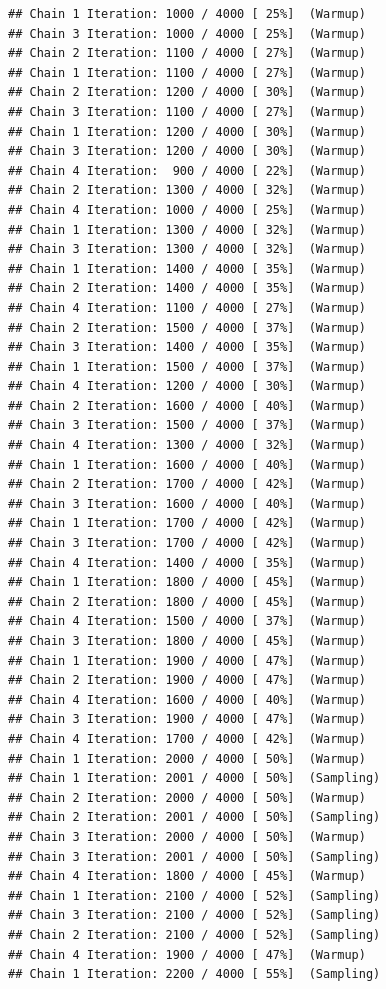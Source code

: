 \documentclass[
]{article}
\begin{document}
\begin{verbatim}
## Chain 1 Iteration: 1000 / 4000 [ 25%]  (Warmup) 
## Chain 3 Iteration: 1000 / 4000 [ 25%]  (Warmup) 
## Chain 2 Iteration: 1100 / 4000 [ 27%]  (Warmup) 
## Chain 1 Iteration: 1100 / 4000 [ 27%]  (Warmup) 
## Chain 2 Iteration: 1200 / 4000 [ 30%]  (Warmup) 
## Chain 3 Iteration: 1100 / 4000 [ 27%]  (Warmup) 
## Chain 1 Iteration: 1200 / 4000 [ 30%]  (Warmup) 
## Chain 3 Iteration: 1200 / 4000 [ 30%]  (Warmup) 
## Chain 4 Iteration:  900 / 4000 [ 22%]  (Warmup) 
## Chain 2 Iteration: 1300 / 4000 [ 32%]  (Warmup) 
## Chain 4 Iteration: 1000 / 4000 [ 25%]  (Warmup) 
## Chain 1 Iteration: 1300 / 4000 [ 32%]  (Warmup) 
## Chain 3 Iteration: 1300 / 4000 [ 32%]  (Warmup) 
## Chain 1 Iteration: 1400 / 4000 [ 35%]  (Warmup) 
## Chain 2 Iteration: 1400 / 4000 [ 35%]  (Warmup) 
## Chain 4 Iteration: 1100 / 4000 [ 27%]  (Warmup) 
## Chain 2 Iteration: 1500 / 4000 [ 37%]  (Warmup) 
## Chain 3 Iteration: 1400 / 4000 [ 35%]  (Warmup) 
## Chain 1 Iteration: 1500 / 4000 [ 37%]  (Warmup) 
## Chain 4 Iteration: 1200 / 4000 [ 30%]  (Warmup) 
## Chain 2 Iteration: 1600 / 4000 [ 40%]  (Warmup) 
## Chain 3 Iteration: 1500 / 4000 [ 37%]  (Warmup) 
## Chain 4 Iteration: 1300 / 4000 [ 32%]  (Warmup) 
## Chain 1 Iteration: 1600 / 4000 [ 40%]  (Warmup) 
## Chain 2 Iteration: 1700 / 4000 [ 42%]  (Warmup) 
## Chain 3 Iteration: 1600 / 4000 [ 40%]  (Warmup) 
## Chain 1 Iteration: 1700 / 4000 [ 42%]  (Warmup) 
## Chain 3 Iteration: 1700 / 4000 [ 42%]  (Warmup) 
## Chain 4 Iteration: 1400 / 4000 [ 35%]  (Warmup) 
## Chain 1 Iteration: 1800 / 4000 [ 45%]  (Warmup) 
## Chain 2 Iteration: 1800 / 4000 [ 45%]  (Warmup) 
## Chain 4 Iteration: 1500 / 4000 [ 37%]  (Warmup) 
## Chain 3 Iteration: 1800 / 4000 [ 45%]  (Warmup) 
## Chain 1 Iteration: 1900 / 4000 [ 47%]  (Warmup) 
## Chain 2 Iteration: 1900 / 4000 [ 47%]  (Warmup) 
## Chain 4 Iteration: 1600 / 4000 [ 40%]  (Warmup) 
## Chain 3 Iteration: 1900 / 4000 [ 47%]  (Warmup) 
## Chain 4 Iteration: 1700 / 4000 [ 42%]  (Warmup) 
## Chain 1 Iteration: 2000 / 4000 [ 50%]  (Warmup) 
## Chain 1 Iteration: 2001 / 4000 [ 50%]  (Sampling) 
## Chain 2 Iteration: 2000 / 4000 [ 50%]  (Warmup) 
## Chain 2 Iteration: 2001 / 4000 [ 50%]  (Sampling) 
## Chain 3 Iteration: 2000 / 4000 [ 50%]  (Warmup) 
## Chain 3 Iteration: 2001 / 4000 [ 50%]  (Sampling) 
## Chain 4 Iteration: 1800 / 4000 [ 45%]  (Warmup) 
## Chain 1 Iteration: 2100 / 4000 [ 52%]  (Sampling) 
## Chain 3 Iteration: 2100 / 4000 [ 52%]  (Sampling) 
## Chain 2 Iteration: 2100 / 4000 [ 52%]  (Sampling) 
## Chain 4 Iteration: 1900 / 4000 [ 47%]  (Warmup) 
## Chain 1 Iteration: 2200 / 4000 [ 55%]  (Sampling) 

\end{verbatim}
\end{document}
